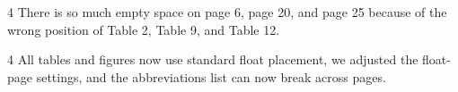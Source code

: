 \begin{reviewcomment}{4}
	There is so much empty space on page 6, page 20, and page 25 because of the wrong position of Table 2, Table 9, and Table 12.
\end{reviewcomment}

\begin{reviewresponse}{4}
	All tables and figures now use standard float placement, we adjusted the float-page settings, and the abbreviations list can now break across pages.

\end{reviewresponse}
